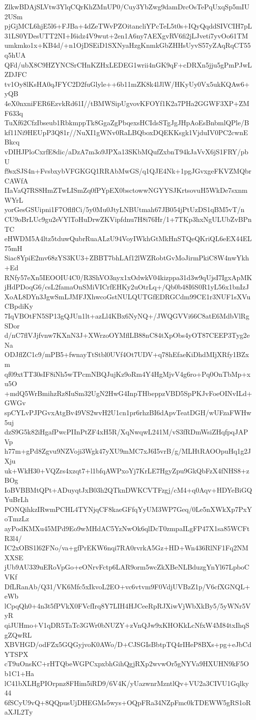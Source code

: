 ZlkwBDAjSLVtw3YlqCQrKhZMnUP0/Cuy3YbZwg9damDrcOsTePqUxqSp5mIU2USm
pjGjMCL6hjE5l6+FJBa+4dZeTWvPZOitancliYPcTeL5t0s+IQyQqddSIVCIH7pL
31LS0YDesUTT2NI+I6idz4V9wut+2en1A6ny7AEXgvRV6fi2jLJveti7yvOo61TM
umkmko1x+KB4d/+n1OjDSEiD1SXNyaHzgKnmkGbZHHsUyvS57yZAqRqCT55q5hUA
QFd/ubX8C9HZYNCSrCHnKZHxLEDEG1wrii4nGK9qF+cDRXn5jju5gPmPJwLZDJFC
tv1Oy8lKsHA0qJFYC2D2fuGlyle++6b11mZK8k4lJlW/HKyUy0Vx5ukKQAw6+yQB
4eX0nxniFER6EzvkRd61I//tBMWSipUgvovKFOYf1K2a7PHa2GGWF3XP+ZMF633q
TuXf62CfzIbseub1RbkmppTk8GgaZgPbqexsHCIdsSTgJgJHpAoEsBnbmlQPle/B
kf11Ni9HEUpP3Q81r//NuXI1gWNv0RaLBQboxDQEKKsgk1VjduIV0PC2cwnEBkcq
vDIHJPloCxrfE8dic/aDzA7m3o9JPXa13SKbMQufZxbnT94kJaVvX6jS1FRY/pbU
f9sxSJS4n+FvsbxybVFGKGQ1RRAbMwGS/q1QJE4Nk+1pgJGvxgeFKVZMQbrCAWfA
IIaVaQ7RS8HmZTwLISmZq0fPYpEX0bsctowwNGYYSJKrtsovuH5WkDe7sxnmWYrL
yorGesGSUipni1F7OflflCi/5y0Mu0JtyLNBUtmah67JB054jPtUzDS1qBM5vT/n
CU9oBrLUc9gu2eVYlToHuDrwZKVipfdnu7H8i76Hr/1+7TKp3hxNgULUbZvBPnTC
eHWDM5A4ltz5tduwQubrRuaALzU94VoyIWkhGtMkHnSTQeQKriQL6eEX44EL75mH
Siac8YpiE2mv68zYS3KU3+ZBBT7bhLAf12lWZRobtGvMoJirmPkiC8W4nwYkh+Ed
RNfy57eXn5IEOOIU4C0/R3ShVO3nyx1xOdwkV04kizppa31d3w9qUjsI7IgxApMK
jHdPDoqG6/csL2famaOnSMiVICrfEHKy2uOtrLq+/Qb0b48I6S0R1yL56x1bnIzJ
XoAL8DYn3JgwSmLJMFJXhwcoGstNULQUTGfEDRGCdm99CE1r3NUF1sXVuCBpdiKy
7IqVBOtFN5SP13gQJUn1lt+azLl4KBx6NyNQ+/JWQGVVi66C8atE6MdbVlRgSDor
d/nC7flVJjfvnw7KXnN3J+XWrzoOYMflLB88nC84tXpObs4yOT87CEEP3Tyg2eNa
ODJflZC1c9/mPB5+fwnayTtStbl0UVf4Ot7UDV+q78hEfaeKiDhdMIjXRfy1BZxm
qf09xtTT30sIF8iNh5wTPcmNBQJujKz9oRm4Y4HgMjvV4g6ro+Pq0OnTbMp+xu5O
+mdQ5WrBmihzRz8IuSm32UgN2HwG4InpTHbeppzVBD5SpPKJvFoeOINvILd+GWGv
spCYLvPJPGvxAtgBv49VS2wvH2U1cn1pr6rhzBI6dApvTeatDGH/wUFzaFWHw5uj
dzS9G5k82iHgafPwcPIInPtZF4xH5R/XqNwqwL241M/vS3fRDmWsiZHqfpqJAPVp
h77m+gPd8Zgvu9NZVoji3Wgk47yXU9mMC7xJ6I5vrB/g/MLHtRAOOpuHq1g2JXju
uk+WkH30+VQZrs4xzqt7+l1bfqAWPxoYj7KrLE7HgyZpu9GkQbFzX4fNHS8+zBOg
IoBVBBMtQPt+ADuyqtJxB03h2QTknDWKCVTFzgj/cM4+q0Aqv+HDYeBiGQYuBrLh
PONQihkzIRwmPCHL4TYNjqCF8kaeGFfqYyUM3WP7Geq/0Le5nXWkXp7PxYoTmzLz
ayPodKMXu45MPd9Eo9wMHdAC5YzNwOk6qlDcT0zmpaILgFP47X1sa85WCFtR3l4/
IC2xOBS1l62FNo/va+gfPrEKW6nqi7RA0rvrkA5Gz+HD+Wn436RlNF1Fq2NMXXSE
jUb9AU339uERoVpGo+eONrvFctp6LAR9orm5wcZkXBeNLBduzgYnYl67LpboCVKf
DfLRanAb/Q31/VK6Mfc5xIkvoL2EO+vc6vtvm9F0VdjUVBzZ1p/V6cfXGNQL+eWb
lCpqQh0+4n3t5fPVkX0FVcfIrq8Y7LIH4HJCeeRpRJXiwVjWbXkBy5/5yWNr5VyR
qiJUHmo+V1qDR5TaTc3GWr0bNUZY+zVnQJw9xKHOKkLcNfxW4M84txIhqSgZQwRL
XBVHGD/odFZx5GQGyjvoK0AWo/D+CJSGIsBbtpTQ4rIHeP8BXs+pg+eJbCdYTSPX
cT9uOnsKC+rHTQbeWGPCxpxbhGihQgjRXp2wvwOr5gNYVa9HXUHN9kF5Ob1C1+Ha
lC41bXLHgPIOrpnz8FHim5iRD9/6V4K/yUazwnrMzntlQv+VU2a3CIVU1Gqlky44
6fSCyU9vQ+8QQpusUjDHEGMs5wys+OQpFRa34NZpFmc0kTDEWW5gRS1oRaXJL2Ty
